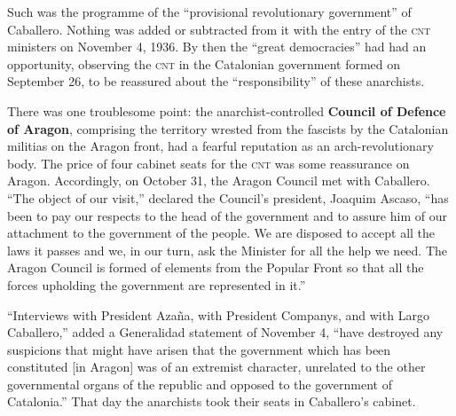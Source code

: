 Such was the programme of the ``provisional revolutionary government'' of Caballero. Nothing was added or subtracted from it with the entry of the \textsc{cnt} ministers on November 4, 1936. By then the ``great democracies'' had had an opportunity, observing the \textsc{cnt} in the Catalonian government formed on September 26, to be reassured about the ``responsibility'' of these anarchists.

There was one troublesome point: the anarchist-controlled \textbf{Council of Defence of Aragon}, comprising the territory wrested from the fascists by the Catalonian militias on the Aragon front, had a fearful reputation as an arch-revolutionary body. The price of four cabinet seats for the \textsc{cnt} was some reassurance on Aragon. Accordingly, on October 31, the Aragon Council met with Caballero. ``The object of our visit,'' declared the Council’s president, Joaquim Ascaso, ``has been to pay our respects to the head of the government and to assure him of our attachment to the government of the people. We are disposed to accept all the laws it passes and we, in our turn, ask the Minister for all the help we need. The Aragon Council is formed of elements from the Popular Front so that all the forces upholding the government are represented in it.''

``Interviews with President Azaña, with President Companys, and with Largo Caballero,'' added a Generalidad statement of November 4, ``have destroyed any suspicions that might have arisen that the government which has been constituted [in Aragon] was of an extremist character, unrelated to the other governmental organs of the republic and opposed to the government of Catalonia.'' That day the anarchists took their seats in Caballero’s cabinet.